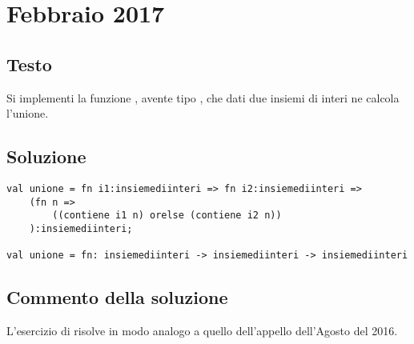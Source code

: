 \section{Febbraio 2017}

\subsection{Testo}

Si implementi la funzione , avente tipo , che dati due insiemi di interi ne calcola l'unione.

\subsection{Soluzione}

\begin{lstlisting}[style = SML, caption = {Definizione della funzione \sml{unione}}]
val unione = fn i1:insiemediinteri => fn i2:insiemediinteri =>
	(fn n =>
		((contiene i1 n) orelse (contiene i2 n))
	):insiemediinteri;

val unione = fn: insiemediinteri -> insiemediinteri -> insiemediinteri
\end{lstlisting}

\subsection{Commento della soluzione}

L'esercizio di risolve in modo analogo a quello dell'appello dell'Agosto del 2016.
